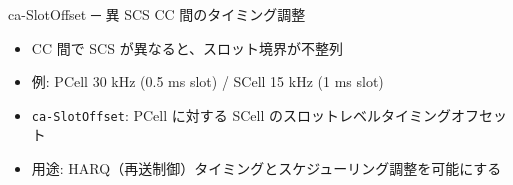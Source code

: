 \begin{frame}{ca-SlotOffset ─ 異 SCS CC 間のタイミング調整}
\begin{itemize}
  \item CC 間で SCS が異なると、スロット境界が不整列
  \item 例: PCell 30 kHz (0.5 ms slot) / SCell 15 kHz (1 ms slot)
  \item \texttt{ca-SlotOffset}: PCell に対する SCell のスロットレベルタイミングオフセット
  \item 用途: HARQ（再送制御）タイミングとスケジューリング調整を可能にする
\end{itemize}
\end{frame}
